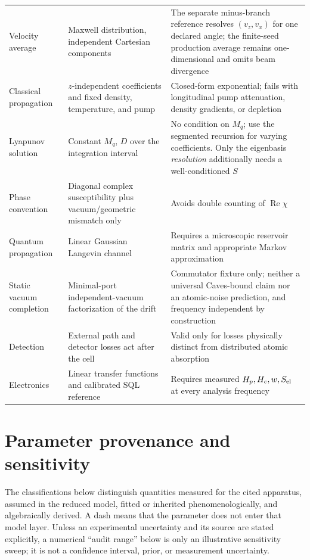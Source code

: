 \documentclass[11pt,a4paper]{article}
\newcommand{\Rea}{\operatorname{Re}}
\begin{document}
\begin{longtable}{L{3.4cm}L{5.0cm}L{5.6cm}}
Velocity average & Maxwell distribution, independent Cartesian components &
The separate minus-branch reference resolves $(v_z,v_x)$ for one declared
angle; the finite-seed production average remains one-dimensional and omits
beam divergence\\
Classical propagation & $z$-independent coefficients and fixed density,
temperature, and pump & Closed-form exponential; fails with longitudinal
pump attenuation, density gradients, or depletion\\
Lyapunov solution & Constant $M_q$, $D$ over the integration interval &
No condition on $M_q$; use the segmented recursion for varying coefficients.
Only the eigenbasis \emph{resolution} additionally needs a well-conditioned
$S$\\
Phase convention & Diagonal complex susceptibility plus vacuum/geometric
mismatch only & Avoids double counting of $\Rea\chi$\\
Quantum propagation & Linear Gaussian Langevin channel & Requires a
microscopic reservoir matrix and appropriate Markov approximation\\
Static vacuum completion & Minimal-port independent-vacuum factorization of
the drift & Commutator fixture only; neither a universal Caves-bound claim nor
an atomic-noise prediction, and frequency independent by construction\\
Detection & External path and detector losses act after the cell &
Valid only for losses physically distinct from distributed atomic absorption\\
Electronics & Linear transfer functions and calibrated SQL reference &
Requires measured $H_p,H_c,w,S_{\rm el}$ at every analysis frequency\\
\end{longtable}

\section{Parameter provenance and sensitivity}
\label{app:parameters}

The classifications below distinguish quantities measured for the cited
apparatus, assumed in the reduced model, fitted or inherited
phenomenologically, and algebraically derived. A dash means that the
parameter does not enter that model layer. Unless an experimental uncertainty
and its source are stated explicitly, a numerical ``audit range'' below is only
an illustrative sensitivity sweep; it is not a confidence interval, prior, or
measurement uncertainty.
\end{document}
